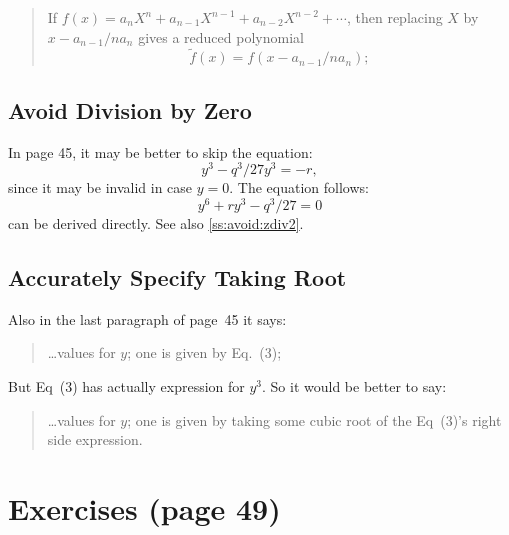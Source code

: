 \begin{quotation}
\setcounter{quotelem}{42} %
  \begin{quotelem}
    If \(f(x) = a_nX^n + a_{n-1}X^{n-1} + a_{n-2}X^{n-2} + \cdots\),
    then replacing $X$ by \(x - a_{n-1}/na_n\) gives a reduced polynomial
    \begin{equation*}
      \tilde{f}(x) = f(x - a_{n-1}/na_n);
    \end{equation*}
    \mldots
  \end{quotelem}
\end{quotation}


\subsection{Avoid Division by Zero} \label{ss:avoid:zdiv}

In page 45, it may be better to skip the equation:
\[y^3 -q^3/27y^3 = -r,\]
since it may be invalid in case \(y=0\).
The equation follows:
\[y^6+ry^3-q^3/27=0\]
can be derived directly.
See also \ref{ss:avoid:zdiv2}.

\subsection{Accurately Specify Taking Root}

Also in the last paragraph of page~45 it says:
\begin{quotation}
\ldots values for $y$; one is given by Eq.~(3);
\end{quotation}
But Eq~(3) has actually expression for \(y^3\).
So it would be better to say:
\begin{quotation}
\ldots values for $y$; one is given by taking some cubic root
of the Eq~(3)'s right side expression.
\end{quotation}

\section{Exercises (page 49)}

